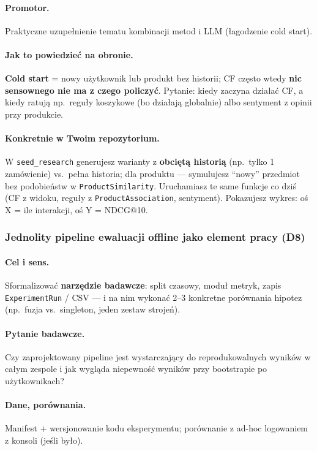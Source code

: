 \documentclass[a4paper,11pt]{article}
\newcommand{\code}[1]{\texttt{\small #1}}
\begin{document}
\paragraph{Promotor.}
Praktyczne uzupełnienie tematu kombinacji metod i LLM (łagodzenie cold start).

\paragraph{Jak to powiedzieć na obronie.}
\textbf{Cold start} = nowy użytkownik lub produkt bez historii; CF często wtedy \textbf{nic sensownego nie ma z czego policzyć}. Pytanie: kiedy zaczyna działać CF, a kiedy ratują np.\ reguły koszykowe (bo działają globalnie) albo sentyment z opinii przy produkcie.

\paragraph{Konkretnie w Twoim repozytorium.}
W \texttt{seed\_research} generujesz warianty z \textbf{obciętą historią} (np.\ tylko 1 zamówienie) vs.\ pełna historia; dla produktu --- symulujesz ``nowy'' przedmiot bez podobieństw w \code{ProductSimilarity}. Uruchamiasz te same funkcje co dziś (CF z widoku, reguły z \code{ProductAssociation}, sentyment). Pokazujesz wykres: oś X = ile interakcji, oś Y = NDCG@10.

\subsubsection{Jednolity pipeline ewaluacji offline jako element pracy (\textbf{D8})}

\paragraph{Cel i sens.}
Sformalizować \textbf{narzędzie badawcze}: split czasowy, moduł metryk, zapis \texttt{ExperimentRun} / CSV --- i na nim wykonać 2--3 konkretne porównania hipotez (np.\ fuzja vs.\ singleton, jeden zestaw strojeń).

\paragraph{Pytanie badawcze.}
Czy zaprojektowany pipeline jest wystarczający do reprodukowalnych wyników w całym zespole i jak wygląda niepewność wyników przy bootstrapie po użytkownikach?

\paragraph{Dane, porównania.}
Manifest + wersjonowanie kodu eksperymentu; porównanie z ad-hoc logowaniem z konsoli (jeśli było).
\end{document}

